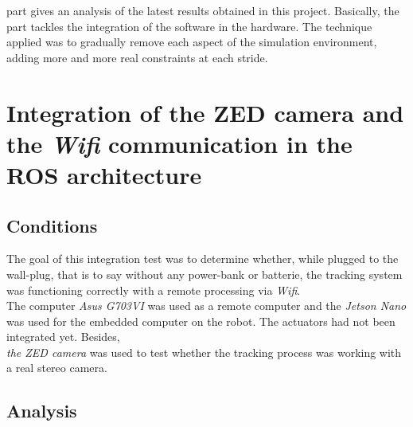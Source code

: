 	 part gives an analysis of the latest results
	obtained in this project. Basically, the part tackles
	the integration of the software in the hardware. The technique 
	applied was to gradually remove each aspect of the simulation 
	environment, adding more and more real constraints at each stride.
	

	
	\section{Integration of the ZED camera and the \textit{Wifi} communication in the ROS architecture}\label{test1}
		
		\subsection{Conditions}
		
		The goal of this integration test was to determine whether, while plugged 
		to the wall-plug, that is to say without any power-bank or 
		batterie, the tracking system was functioning correctly
		with a remote processing via \textit{Wifi}.
		\\\indent The computer \textit{Asus G703VI} was used
		as a remote computer and the \textit{Jetson Nano} was 
		used for the embedded computer on the robot. The
		actuators had not been integrated yet. Besides,\\
		\textit{the ZED camera} was used to 
		test whether the tracking process was working 
		with a real stereo camera.
		
		\subsection{Analysis}
		

